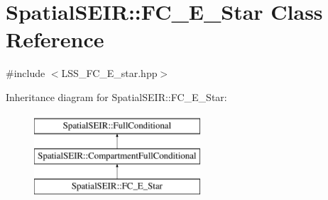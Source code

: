 \hypertarget{classSpatialSEIR_1_1FC__E__Star}{\section{Spatial\-S\-E\-I\-R\-:\-:F\-C\-\_\-\-E\-\_\-\-Star Class Reference}
\label{classSpatialSEIR_1_1FC__E__Star}
}


{\ttfamily \#include $<$L\-S\-S\-\_\-\-F\-C\-\_\-\-E\-\_\-star.\-hpp$>$}

Inheritance diagram for Spatial\-S\-E\-I\-R\-:\-:F\-C\-\_\-\-E\-\_\-\-Star\-:\begin{figure}[H]
\begin{center}
\leavevmode
\includegraphics[height=3.000000cm]{classSpatialSEIR_1_1FC__E__Star}
\end{center}
\end{figure}
